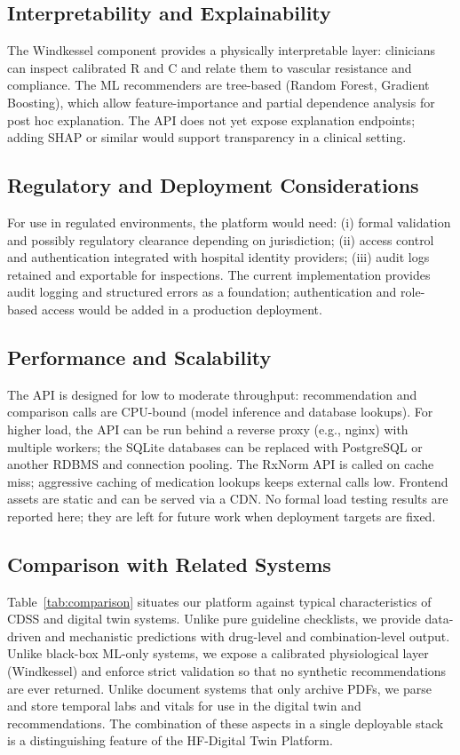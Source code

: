 \documentclass[conference]{IEEEtran}
\begin{document}
\subsection{Interpretability and Explainability}
The Windkessel component provides a physically interpretable layer: clinicians can inspect calibrated R and C and relate them to vascular resistance and compliance. The ML recommenders are tree-based (Random Forest, Gradient Boosting), which allow feature-importance and partial dependence analysis for post hoc explanation. The API does not yet expose explanation endpoints; adding SHAP or similar would support transparency in a clinical setting.

\subsection{Regulatory and Deployment Considerations}
For use in regulated environments, the platform would need: (i) formal validation and possibly regulatory clearance depending on jurisdiction; (ii) access control and authentication integrated with hospital identity providers; (iii) audit logs retained and exportable for inspections. The current implementation provides audit logging and structured errors as a foundation; authentication and role-based access would be added in a production deployment.

\subsection{Performance and Scalability}
The API is designed for low to moderate throughput: recommendation and comparison calls are CPU-bound (model inference and database lookups). For higher load, the API can be run behind a reverse proxy (e.g., nginx) with multiple workers; the SQLite databases can be replaced with PostgreSQL or another RDBMS and connection pooling. The RxNorm API is called on cache miss; aggressive caching of medication lookups keeps external calls low. Frontend assets are static and can be served via a CDN. No formal load testing results are reported here; they are left for future work when deployment targets are fixed.

\subsection{Comparison with Related Systems}
Table~\ref{tab:comparison} situates our platform against typical characteristics of CDSS and digital twin systems. Unlike pure guideline checklists, we provide data-driven and mechanistic predictions with drug-level and combination-level output. Unlike black-box ML-only systems, we expose a calibrated physiological layer (Windkessel) and enforce strict validation so that no synthetic recommendations are ever returned. Unlike document systems that only archive PDFs, we parse and store temporal labs and vitals for use in the digital twin and recommendations. The combination of these aspects in a single deployable stack is a distinguishing feature of the HF-Digital Twin Platform.
\end{document}
